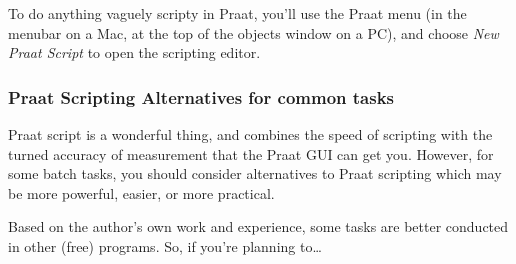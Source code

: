 \documentclass[11pt]{article}
\begin{document}
To do anything vaguely scripty in Praat, you'll use the Praat menu (in
the menubar on a Mac, at the top of the objects window on a PC), and
choose \emph{New Praat Script} to open the scripting editor.

\hypertarget{praat-scripting-alternatives-for-common-tasks}{%
\subsubsection{Praat Scripting Alternatives for common
tasks}\label{praat-scripting-alternatives-for-common-tasks}}

\label{scriptingalternatives}

Praat script is a wonderful thing, and combines the speed of scripting
with the turned accuracy of measurement that the Praat GUI can get you.
However, for some batch tasks, you should consider alternatives to Praat
scripting which may be more powerful, easier, or more practical.

Based on the author's own work and experience, some tasks are better
conducted in other (free) programs. So, if you're planning to\ldots{}
\end{document}
